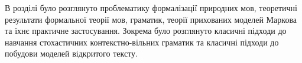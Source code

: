 \chapconclude{\ref{chap:review}}
В розділі було розглянуто проблематику формалізації природних мов, теоретичні результати формальної теорії мов, граматик, теорії прихованих моделей Маркова та їхнє практичне застосування. Зокрема було розглянуто класичні підходи до навчання стохастичних контекстно-вільних граматик та класичні підходи до побудови моделей відкритого тексту.
